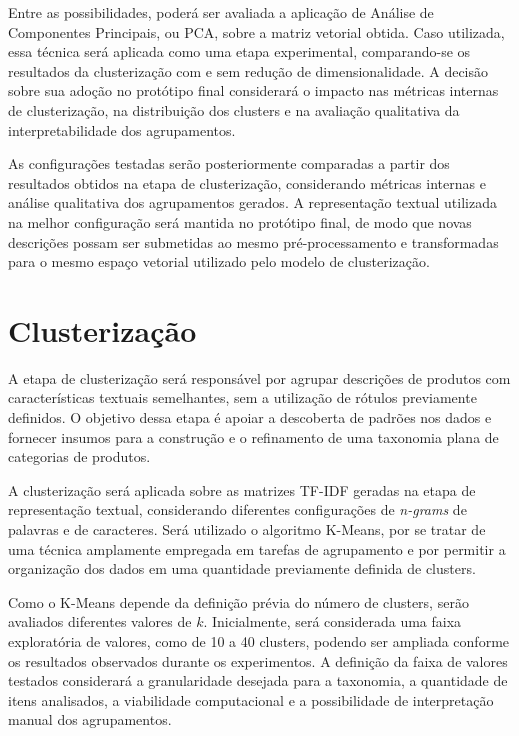 \documentclass[english,brazilian]{UNISINOSmonografia}
\begin{document}
Entre as possibilidades, poderá ser avaliada a aplicação de Análise de Componentes Principais, ou PCA, sobre a matriz vetorial obtida. Caso utilizada, essa técnica será aplicada como uma etapa experimental, comparando-se os resultados da clusterização com e sem redução de dimensionalidade. A decisão sobre sua adoção no protótipo final considerará o impacto nas métricas internas de clusterização, na distribuição dos clusters e na avaliação qualitativa da interpretabilidade dos agrupamentos.

As configurações testadas serão posteriormente comparadas a partir dos resultados obtidos na etapa de clusterização, considerando métricas internas e análise qualitativa dos agrupamentos gerados. A representação textual utilizada na melhor configuração será mantida no protótipo final, de modo que novas descrições possam ser submetidas ao mesmo pré-processamento e transformadas para o mesmo espaço vetorial utilizado pelo modelo de clusterização.




\section{Clusterização}

A etapa de clusterização será responsável por agrupar descrições de produtos com características textuais semelhantes, sem a utilização de rótulos previamente definidos. O objetivo dessa etapa é apoiar a descoberta de padrões nos dados e fornecer insumos para a construção e o refinamento de uma taxonomia plana de categorias de produtos.

A clusterização será aplicada sobre as matrizes TF-IDF geradas na etapa de representação textual, considerando diferentes configurações de \textit{n-grams} de palavras e de caracteres. Será utilizado o algoritmo K-Means, por se tratar de uma técnica amplamente empregada em tarefas de agrupamento e por permitir a organização dos dados em uma quantidade previamente definida de clusters.

Como o K-Means depende da definição prévia do número de clusters, serão avaliados diferentes valores de $k$. Inicialmente, será considerada uma faixa exploratória de valores, como de 10 a 40 clusters, podendo ser ampliada conforme os resultados observados durante os experimentos. A definição da faixa de valores testados considerará a granularidade desejada para a taxonomia, a quantidade de itens analisados, a viabilidade computacional e a possibilidade de interpretação manual dos agrupamentos.
\end{document}
